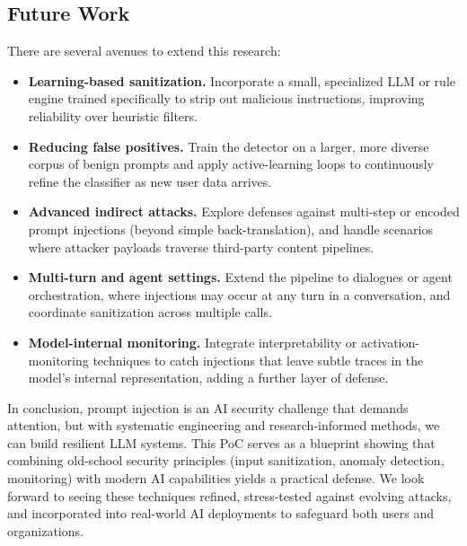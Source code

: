 \documentclass[conference]{IEEEtran}
\begin{document}
\subsection*{Future Work}

There are several avenues to extend this research:

\begin{itemize}
  \item \textbf{Learning-based sanitization.}  Incorporate a small, specialized LLM or rule engine trained specifically to strip out malicious instructions, improving reliability over heuristic filters.
  \item \textbf{Reducing false positives.}  Train the detector on a larger, more diverse corpus of benign prompts and apply active-learning loops to continuously refine the classifier as new user data arrives.
  \item \textbf{Advanced indirect attacks.}  Explore defenses against multi-step or encoded prompt injections (beyond simple back-translation), and handle scenarios where attacker payloads traverse third-party content pipelines.
  \item \textbf{Multi-turn and agent settings.}  Extend the pipeline to dialogues or agent orchestration, where injections may occur at any turn in a conversation, and coordinate sanitization across multiple calls.
  \item \textbf{Model-internal monitoring.}  Integrate interpretability or activation-monitoring techniques to catch injections that leave subtle traces in the model’s internal representation, adding a further layer of defense.
\end{itemize}

In conclusion, prompt injection is an AI security challenge that demands attention, but with systematic engineering and research-informed methods, we can build resilient LLM systems. This PoC serves as a blueprint showing that combining old-school security principles (input sanitization, anomaly detection, monitoring) with modern AI capabilities yields a practical defense. We look forward to seeing these techniques refined, stress-tested against evolving attacks, and incorporated into real-world AI deployments to safeguard both users and organizations.





\end{document}
